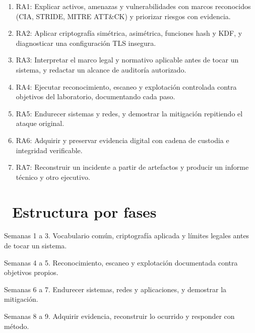 \documentclass[11pt,a4paper]{article}
\newcommand{\iconotexto}[2]{\textcolor{cyanNeon}{\faIcon{#1}}~#2}
\begin{document}
\begin{enumerate}[leftmargin=1.4em,itemsep=2pt,topsep=3pt]
  \item RA1: Explicar activos, amenazas y vulnerabilidades con marcos reconocidos (CIA, STRIDE, MITRE ATT\&CK) y priorizar riesgos con evidencia.
  \item RA2: Aplicar criptografía simétrica, asimétrica, funciones hash y KDF, y diagnosticar una configuración TLS insegura.
  \item RA3: Interpretar el marco legal y normativo aplicable antes de tocar un sistema, y redactar un alcance de auditoría autorizado.
  \item RA4: Ejecutar reconocimiento, escaneo y explotación controlada contra objetivos del laboratorio, documentando cada paso.
  \item RA5: Endurecer sistemas y redes, y demostrar la mitigación repitiendo el ataque original.
  \item RA6: Adquirir y preservar evidencia digital con cadena de custodia e integridad verificable.
  \item RA7: Reconstruir un incidente a partir de artefactos y producir un informe técnico y otro ejecutivo.
\end{enumerate}

\section{\iconotexto{sitemap}{Estructura por fases}}

\begin{tcolorbox}[cajaContenido,title={Fase 1 --- Fundamentos, criptografía y marco legal}]Semanas 1 a 3. Vocabulario común, criptografía aplicada y límites legales antes de tocar un sistema.
\end{tcolorbox}

\begin{tcolorbox}[cajaContenido,title={Fase 2 --- Ofensiva controlada}]Semanas 4 a 5. Reconocimiento, escaneo y explotación documentada contra objetivos propios.
\end{tcolorbox}

\begin{tcolorbox}[cajaContenido,title={Fase 3 --- Defensa y hardening}]Semanas 6 a 7. Endurecer sistemas, redes y aplicaciones, y demostrar la mitigación.
\end{tcolorbox}

\begin{tcolorbox}[cajaContenido,title={Fase 4 --- Forense y respuesta a incidentes}]Semanas 8 a 9. Adquirir evidencia, reconstruir lo ocurrido y responder con método.
\end{tcolorbox}
\end{document}
